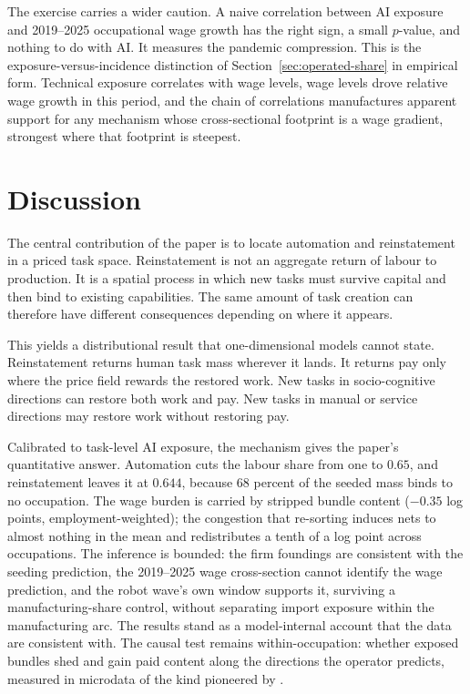 \documentclass[12pt, a4paper]{article}
\begin{document}
The exercise carries a wider caution. A naive correlation between AI
exposure and 2019--2025 occupational wage growth has the right sign, a
small $p$-value, and nothing to do with AI. It measures the pandemic
compression. This is the exposure-versus-incidence distinction of
Section~\ref{sec:operated-share} in empirical form. Technical exposure
correlates with wage levels, wage levels drove relative wage growth in
this period, and the chain of correlations manufactures apparent support
for any mechanism whose cross-sectional footprint is a wage gradient,
strongest where that footprint is steepest.

\section{Discussion}
\label{sec:discuss}

The central contribution of the paper is to locate automation and
reinstatement in a priced task space. Reinstatement is not an aggregate
return of labour to production. It is a spatial process in which new
tasks must survive capital and then bind to existing capabilities. The
same amount of task creation can therefore have different consequences
depending on where it appears.

This yields a distributional result that one-dimensional models cannot
state. Reinstatement returns human task mass wherever it lands. It
returns pay only where the price field rewards the restored work. New
tasks in socio-cognitive directions can restore both work and pay. New
tasks in manual or service directions may restore work without
restoring pay.

Calibrated to task-level AI exposure, the mechanism gives the paper's
quantitative answer. Automation cuts the labour share from one to
$0.65$, and reinstatement leaves it at $0.644$, because $68$ percent of
the seeded mass binds to no occupation. The wage burden is carried by
stripped bundle content ($-0.35$ log points, employment-weighted); the
congestion that re-sorting induces nets to almost nothing in the mean
and redistributes a tenth of a log point across occupations. The
inference is bounded: the firm foundings are consistent
with the seeding prediction, the 2019--2025 wage cross-section cannot
identify the wage prediction, and the robot wave's own window supports
it, surviving a manufacturing-share control, without separating import
exposure within the manufacturing arc. The results stand as a model-internal account that
the data are consistent with. The causal test remains within-occupation:
whether exposed bundles shed and gain paid content along the directions
the operator predicts, measured in microdata of the kind pioneered by
\textcite{atalay2020evolution}.
\end{document}

